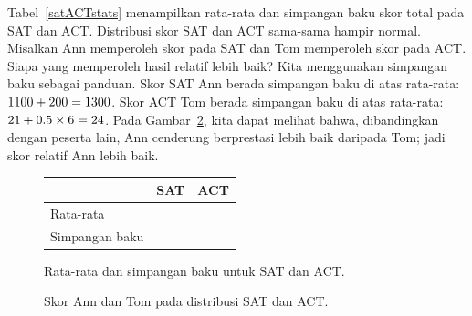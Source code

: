 \begin{examplewrap}
\begin{nexample}{Tabel~\vref{satACTstats} menampilkan rata-rata
    dan simpangan baku skor total pada SAT dan ACT.
    Distribusi skor SAT dan ACT sama-sama hampir normal.
    Misalkan Ann memperoleh skor \annsatscore{} pada SAT dan Tom
    memperoleh skor \tomsatscore{} pada ACT.
    Siapa yang memperoleh hasil relatif lebih baik?}
  \label{actSAT}%
  Kita menggunakan simpangan baku sebagai panduan.
  Skor SAT Ann berada \annsatzscore{} simpangan baku di atas rata-rata:
  $1100{} + 200{} = 1300{}$.
  Skor ACT Tom berada \tomsatzscore{} simpangan baku di atas rata-rata:
  $21{} + 0.5{} \times 6{} = 24{}$.
  Pada Gambar~\ref{satActNormals}, kita dapat melihat bahwa,
  dibandingkan dengan peserta lain, Ann cenderung berprestasi lebih baik
  daripada Tom; jadi skor relatif Ann lebih baik.
\end{nexample}
\end{examplewrap}

\begin{figure}[h]
\centering
\begin{tabular}{l r r}
  \hline
  & SAT & ACT \\
  \hline
  Rata-rata \hspace{0.3cm} & \satmean{} & \actmean{} \\
  Simpangan baku & \satsd{} & \actsd{} \\
  \hline
\end{tabular}
\caption{Rata-rata dan simpangan baku untuk SAT dan ACT.}
\label{satACTstats}
\end{figure}

\begin{figure}
  \centering
  \caption{Skor Ann dan Tom pada distribusi SAT dan ACT.}
  \label{satActNormals}
\end{figure}


